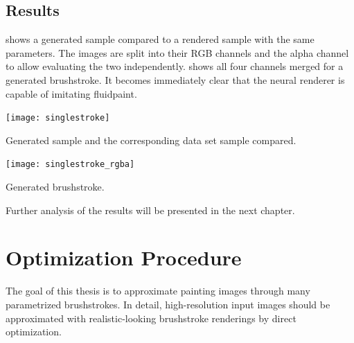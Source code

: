 \subsection{Results}
 shows a generated sample compared to a rendered sample with the same parameters.
The images are split into their RGB channels and the alpha channel to allow evaluating the two independently.
 shows all four channels merged for a generated brushstroke.
It becomes immediately clear that the neural renderer is capable of imitating fluidpaint.
\begin{marginfigure}
    \texttt{[image: singlestroke]}
    \caption{Generated sample and the corresponding data set sample compared.}
\end{marginfigure}
\begin{marginfigure}
    \texttt{[image: singlestroke\_rgba]}
    \caption{Generated brushstroke.}
\end{marginfigure}

Further analysis of the results will be presented in the next chapter.


\section{Optimization Procedure}
The goal of this thesis is to approximate painting images through many parametrized brushstrokes.
In detail, high-resolution input images should be approximated with realistic-looking brushstroke renderings by direct optimization.

